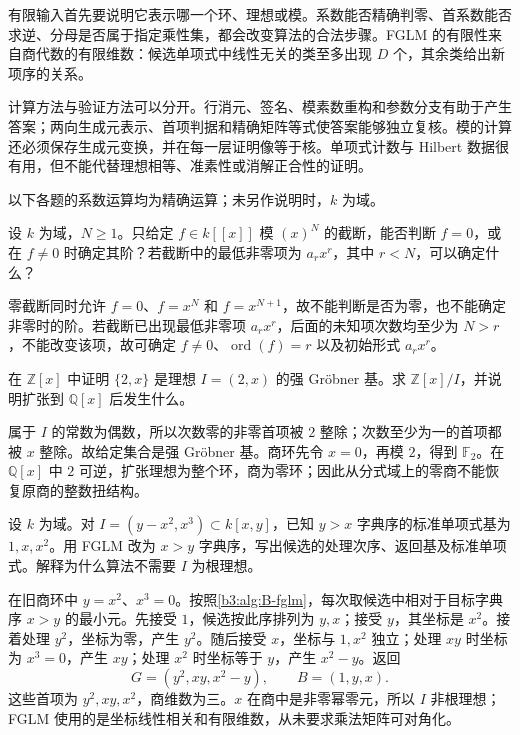 \begin{chaptersummary}
	有限输入首先要说明它表示哪一个环、理想或模。系数能否精确判零、首系数能否求逆、分母是否属于指定乘性集，都会改变算法的合法步骤。FGLM 的有限性来自商代数的有限维数：候选单项式中线性无关的类至多出现 \(D\) 个，其余类给出新项序的关系。

	\ProseParagraphBreak
	计算方法与验证方法可以分开。行消元、签名、模素数重构和参数分支有助于产生答案；两向生成元表示、首项判据和精确矩阵等式使答案能够独立复核。模的计算还必须保存生成元变换，并在每一层证明像等于核。单项式计数与 Hilbert 数据很有用，但不能代替理想相等、准素性或消解正合性的证明。
\end{chaptersummary}

\BookExercises
以下各题的系数运算均为精确运算；未另作说明时，\(k\) 为域。

\begin{exercise}\label{b3:ex:B-truncation}
	设 \(k\) 为域，\(N\ge1\)。只给定 \(f\in k[\![x]\!]\) 模 \((x)^N\) 的截断，能否判断 \(f=0\)，或在 \(f\ne0\) 时确定其阶？若截断中的最低非零项为 \(a_rx^r\)，其中 \(r<N\)，可以确定什么？
\end{exercise}
\begin{solution}
	零截断同时允许 \(f=0\)、\(f=x^N\) 和 \(f=x^{N+1}\)，故不能判断是否为零，也不能确定非零时的阶。若截断已出现最低非零项 \(a_rx^r\)，后面的未知项次数均至少为 \(N>r\)，不能改变该项，故可确定 \(f\ne0\)、\(\operatorname{ord}(f)=r\) 以及初始形式 \(a_rx^r\)。
\end{solution}

\begin{exercise}\label{b3:ex:B-strong-basis}
	在 \(\mathbb Z[x]\) 中证明 \(\{2,x\}\) 是理想 \(I=(2,x)\) 的强 Gröbner 基。求 \(\mathbb Z[x]/I\)，并说明扩张到 \(\mathbb Q[x]\) 后发生什么。
\end{exercise}
\begin{solution}
	属于 \(I\) 的常数为偶数，所以次数零的非零首项被 \(2\) 整除；次数至少为一的首项都被 \(x\) 整除。故给定集合是强 Gröbner 基。商环先令 \(x=0\)，再模 \(2\)，得到 \(\mathbb F_2\)。在 \(\mathbb Q[x]\) 中 \(2\) 可逆，扩张理想为整个环，商为零环；因此从分式域上的零商不能恢复原商的整数扭结构。
\end{solution}

\begin{exercise}\label{b3:ex:B-fglm-nonreduced}
	设 \(k\) 为域。对 \(I=(y-x^2,x^3)\subset k[x,y]\)，已知 \(y>x\) 字典序的标准单项式基为 \(1,x,x^2\)。用 FGLM 改为 \(x>y\) 字典序，写出候选的处理次序、返回基及标准单项式。解释为什么算法不需要 \(I\) 为根理想。
\end{exercise}
\begin{solution}
	在旧商环中 \(y=x^2\)、\(x^3=0\)。按照\cref{b3:alg:B-fglm}，每次取候选中相对于目标字典序 \(x>y\) 的最小元。先接受 \(1\)，候选按此序排列为 \(y,x\)；接受 \(y\)，其坐标是 \(x^2\)。接着处理 \(y^2\)，坐标为零，产生 \(y^2\)。随后接受 \(x\)，坐标与 \(1,x^2\) 独立；处理 \(xy\) 时坐标为 \(x^3=0\)，产生 \(xy\)；处理 \(x^2\) 时坐标等于 \(y\)，产生 \(x^2-y\)。返回
	\[
		G=(y^2,xy,x^2-y),\qquad B=(1,y,x).
	\]
	这些首项为 \(y^2,xy,x^2\)，商维数为三。\(x\) 在商中是非零幂零元，所以 \(I\) 非根理想；FGLM 使用的是坐标线性相关和有限维数，从未要求乘法矩阵可对角化。
\end{solution}

